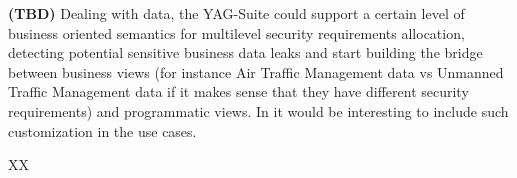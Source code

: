 \begin{Workpackage}{\thewpno}
\begin{Task}
  \TaskHeader{}
  \color{blue} \textbf{(TBD)}
  Dealing with data, the YAG-Suite could support a certain level of business oriented semantics for multilevel security requirements allocation, detecting potential sensitive business data leaks and start building the bridge between business views (for instance Air Traffic Management data vs Unmanned Traffic Management data if it makes sense that they have different security requirements) and programmatic views.
  In \TheProject{} it would be interesting to include such customization in the use cases.
  
  \end{Task}

\begin{WPDeliverables}
  \begin{compactitem}
    \item XX
\end{compactitem}
\end{WPDeliverables}
\end{Workpackage}
